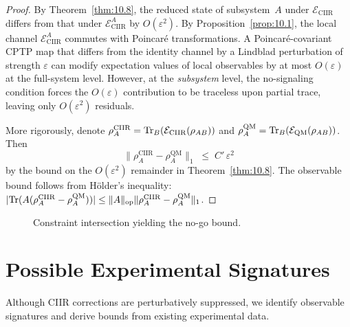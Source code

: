 \begin{proof}
By Theorem~\ref{thm:10.8}, the reduced state of subsystem~$A$ under
$\mathcal{E}_{\mathrm{CIIR}}$ differs from that under
$\mathcal{E}_{\mathrm{CIIR}}^A$ by $O(\varepsilon^2)$.  By
Proposition~\ref{prop:10.1}, the local channel
$\mathcal{E}_{\mathrm{CIIR}}^A$ commutes with Poincar\'e
transformations.  A Poincar\'e-covariant CPTP map that differs from
the identity channel by a Lindblad perturbation of strength
$\varepsilon$ can modify expectation values of local observables
by at most $O(\varepsilon)$ at the full-system level.  However, at
the \emph{subsystem} level, the no-signaling condition forces the
$O(\varepsilon)$ contribution to be traceless upon partial trace,
leaving only $O(\varepsilon^2)$ residuals.

More rigorously, denote
$\rho_A^{\mathrm{CIIR}}=\mathrm{Tr}_B(\mathcal{E}_{\mathrm{CIIR}}(\rho_{AB}))$
and
$\rho_A^{\mathrm{QM}}=\mathrm{Tr}_B(\mathcal{E}_{\mathrm{QM}}(\rho_{AB}))$.
Then
\[
  \bigl\|\rho_A^{\mathrm{CIIR}}-\rho_A^{\mathrm{QM}}\bigr\|_1
  \;\leq\;
  C'\,\varepsilon^2
\]
by the bound on the $O(\varepsilon^2)$ remainder in
Theorem~\ref{thm:10.8}.  The observable bound
follows from H\"older's inequality:
$|\mathrm{Tr}(A(\rho_A^{\mathrm{CIIR}}-\rho_A^{\mathrm{QM}}))|
\leq \|A\|_{\mathrm{op}}\|\rho_A^{\mathrm{CIIR}}-\rho_A^{\mathrm{QM}}\|_1$.
\end{proof}

\begin{figure}[t]
\centering
{}
\caption{Constraint intersection yielding the no-go bound.}
\label{fig:c10:nogo}
\end{figure}

\section{Possible Experimental Signatures}
\label{sec:ch10:signatures}

Although CIIR corrections are perturbatively suppressed, we identify
observable signatures and derive bounds from existing experimental
data.

